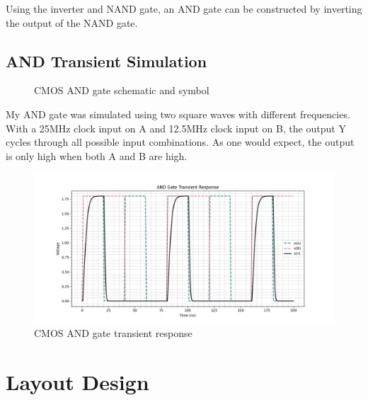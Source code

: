 \documentclass[11pt]{article}
\begin{document}
Using the inverter and NAND gate, an AND gate can be constructed by inverting the output of the NAND gate.

\subsection*{AND Transient Simulation}

\begin{figure}[H]
  \centering
  
  \caption{CMOS AND gate schematic and symbol}
\end{figure}

My AND gate was simulated using two square waves with different frequencies. With a 25MHz clock input on A and 12.5MHz clock input on B, the output Y cycles through all possible input combinations. As one would expect, the output is only high when both A and B are high.

\begin{figure}[H]
  \centering
  \includegraphics[width=\linewidth]{media/and_tran.png}
  \caption{CMOS AND gate transient response}
\end{figure}

\section*{Layout Design}
\end{document}
